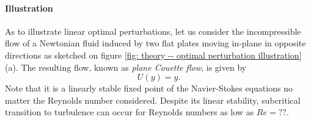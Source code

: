       \paragraph{Illustration}

      As to illustrate linear optimal perturbations, let us consider the incompressible flow of a Newtonian fluid induced by two flat plates moving in-plane in opposite directions as sketched on figure \ref{fig: theory -- optimal perturbation illustration}(a). The resulting flow, known as \emph{plane Couette flow}, is given by
      $$U(y) = y.$$
      Note that it is a linearly stable fixed point of the Navier-Stokes equations no matter the Reynolds number considered. Despite its linear stability, subcritical transition to turbulence can occur for Reynolds numbers as low as $Re=??$.

